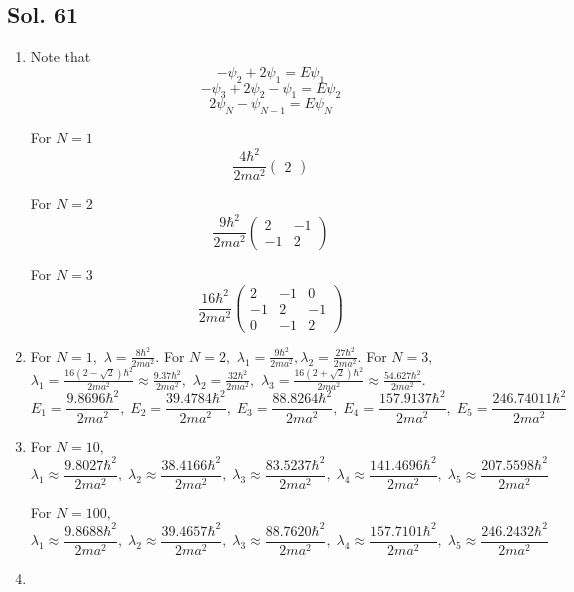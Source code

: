 \subsection*{Sol. 61}
\begin{enumerate}
    \item 
    Note that 
    $$
    -\psi_2+2\psi_1=E\psi_1
    $$
    $$
    -\psi_3+2\psi_2-\psi_1=E\psi_2
    $$
    $$
    2\psi_{N}-\psi_{N-1}=E\psi_N
    $$

For $N=1$
$$
\frac{4\hbar^2}{2ma^2}
\begin{pmatrix}
    2
\end{pmatrix}
$$

For $N=2$
$$
\frac{9\hbar^2}{2ma^2}
\begin{pmatrix}
    2 & -1\\
    -1 & 2
\end{pmatrix}
$$

For $N=3$
$$
\frac{16\hbar^2}{2ma^2}
\begin{pmatrix}
    2 & -1 & 0\\
    -1 & 2 & -1\\
    0 & -1 & 2
\end{pmatrix}
$$
\item 
For $N=1,$ $\lambda=\frac{8\hbar^2}{2ma^2}.$
For $N=2,$ 
$\lambda_1=\frac{9\hbar^2}{2ma^2},
\lambda_2=\frac{27\hbar^2}{2ma^2}.$
For $N=3,$ 
$\lambda_1=\frac{16(2-\sqrt{2})\hbar^2}{2ma^2}
\approx\frac{9.37\hbar^2}{2ma^2},$
$\lambda_2=\frac{32\hbar^2}{2ma^2},$
$\lambda_3=\frac{16(2+\sqrt{2})\hbar^2}{2ma^2}
\approx\frac{54.627\hbar^2}{2ma^2}
.$
$$
E_1=\frac{9.8696\hbar^2}{2ma^2},\;
E_2=\frac{39.4784\hbar^2}{2ma^2},\;
E_3=\frac{88.8264\hbar^2}{2ma^2},\;
E_4=\frac{157.9137\hbar^2}{2ma^2},\;
E_5=\frac{246.74011\hbar^2}{2ma^2}
$$

\item 
For $N=10,$
$$
\lambda_1\approx\frac{9.8027\hbar^2}{2ma^2},
\;
\lambda_2\approx\frac{38.4166\hbar^2}{2ma^2},
\;
\lambda_3\approx\frac{83.5237\hbar^2}{2ma^2},
\;
\lambda_4\approx\frac{141.4696\hbar^2}{2ma^2},
\;
\lambda_5\approx\frac{207.5598\hbar^2}{2ma^2}
$$

For $N=100,$
$$
\lambda_1\approx\frac{9.8688\hbar^2}{2ma^2},
\;
\lambda_2\approx\frac{39.4657\hbar^2}{2ma^2},
\;
\lambda_3\approx\frac{88.7620\hbar^2}{2ma^2},
\;
\lambda_4\approx\frac{157.7101\hbar^2}{2ma^2},
\;
\lambda_5\approx\frac{246.2432\hbar^2}{2ma^2}
$$


\item 



\end{enumerate}

